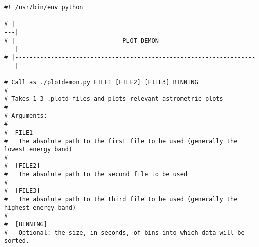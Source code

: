 \begin{verbatim}
#! /usr/bin/env python

# |----------------------------------------------------------------------|
# |------------------------------PLOT DEMON------------------------------|
# |----------------------------------------------------------------------|

# Call as ./plotdemon.py FILE1 [FILE2] [FILE3] BINNING
#
# Takes 1-3 .plotd files and plots relevant astrometric plots
#
# Arguments:
#
#  FILE1
#   The absolute path to the first file to be used (generally the lowest energy band)
#
#  [FILE2]
#   The absolute path to the second file to be used
#
#  [FILE3]
#   The absolute path to the third file to be used (generally the highest energy band)
#
#  [BINNING]
#   Optional: the size, in seconds, of bins into which data will be sorted.


\end{verbatim}
